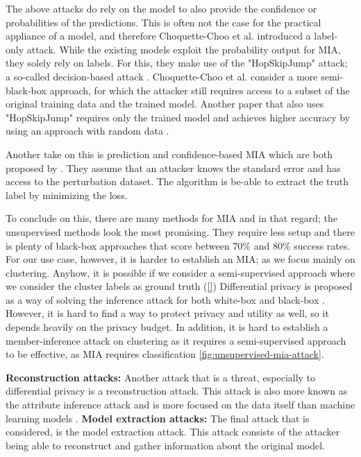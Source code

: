 The above attacks do rely on the model to also provide the confidence or probabilities of the predictions.
This is often not the case for the practical appliance of a model, and therefore Choquette-Choo et al. introduced a label-only attack.
While the existing models exploit the probability output for MIA, they solely rely on labels.
For this, they make use of the "HopSkipJump" attack; a so-called decision-based attack \citep{chen_hopskipjumpattack_2020}.
Choquette-Choo et al. consider a more semi-black-box approach, for which the attacker still requires access to a subset of the original training data and the trained model.
Another paper that also uses "HopSkipJump" requires only the trained model and achieves higher accuracy by using an approach with random data \citep{li_membership_2021}.

Another take on this is prediction and confidence-based MIA which are both proposed by \citep{yeom_privacy_2018}.
They assume that an attacker knows the standard error and has access to the perturbation dataset.
The algorithm is be-able to extract the truth label by minimizing the loss. \newline

To conclude on this, there are many methods for MIA and in that regard; the unsupervised methods look the most promising.
They require less setup and there is plenty of black-box approaches that score between 70\% and 80\% success rates.
For our use case, however, it is harder to establish an MIA; as we focus mainly on clustering.
Anyhow, it is possible if we consider a semi-supervised approach where we consider the cluster labels as ground truth (\ref{})
Differential privacy is proposed as a way of solving the inference attack for both white-box and black-box \citep{hu_membership_2022}.
However, it is hard to find a way to protect privacy and utility as well, so it depends heavily on the privacy budget.
In addition, it is hard to establish a member-inference attack on clustering as it requires a semi-supervised approach to be effective, as MIA requires classification \ref{fig:unsupervised-mia-attack}.


\textbf{Reconstruction attacks:}
Another attack that is a threat, especially to differential privacy is a reconstruction attack.
This attack is also more known as the attribute inference attack and is more focused on the data itself than machine learning models \citep{rigaki_survey_2021}. \newline
\textbf{Model extraction attacks:}
The final attack that is considered, is the model extraction attack.
This attack consists of the attacker being able to reconstruct and gather information about the original model.

